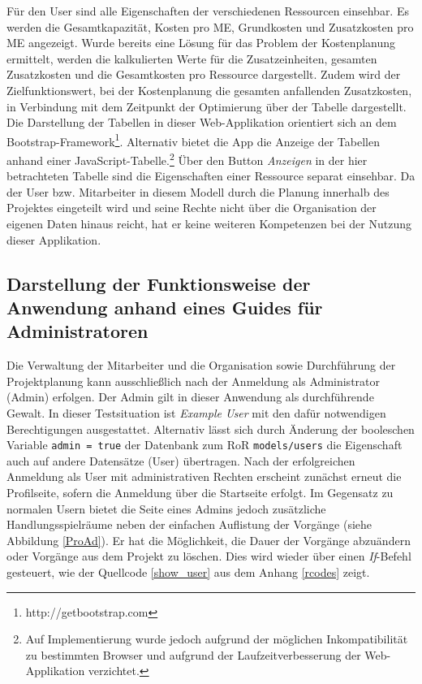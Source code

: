 \documentclass[a4paper,12pt,parskip,bibtotoc,liststotoc]{article}
\begin{document}
Für den User sind alle Eigenschaften der verschiedenen Ressourcen einsehbar. Es werden die Gesamtkapazität, Kosten pro ME, Grundkosten und Zusatzkosten pro ME angezeigt. Wurde bereits eine Lösung für das Problem der Kostenplanung ermittelt, werden die kalkulierten Werte für die Zusatzeinheiten, gesamten Zusatzkosten und die Gesamtkosten pro Ressource dargestellt. Zudem wird der Zielfunktionswert, bei der Kostenplanung die gesamten anfallenden Zusatzkosten, in Verbindung mit dem Zeitpunkt der Optimierung über der Tabelle dargestellt. Die Darstellung der Tabellen in dieser Web-Applikation orientiert sich an dem Bootstrap-Framework\footnote{http://getbootstrap.com}. Alternativ bietet die App die Anzeige der Tabellen anhand einer JavaScript-Tabelle.\footnote{Auf Implementierung wurde jedoch aufgrund der möglichen Inkompatibilität zu bestimmten Browser und aufgrund der Laufzeitverbesserung der Web-Applikation verzichtet.} Über den Button \textit{Anzeigen} in der hier betrachteten Tabelle sind die Eigenschaften einer Ressource separat einsehbar. Da der User bzw. Mitarbeiter in diesem Modell durch die Planung innerhalb des Projektes eingeteilt wird und seine Rechte nicht über die Organisation der eigenen Daten hinaus reicht, hat er keine weiteren Kompetenzen bei der Nutzung dieser Applikation. \\

\subsection{Darstellung der Funktionsweise der Anwendung anhand eines Guides für Administratoren}\label{Admins}

Die Verwaltung der Mitarbeiter und die Organisation sowie Durchführung der Projektplanung kann ausschließlich nach der Anmeldung als Administrator (Admin) erfolgen. Der Admin gilt in dieser Anwendung als durchführende Gewalt. In dieser Testsituation ist \textit{Example User} mit den dafür notwendigen Berechtigungen ausgestattet. Alternativ lässt sich durch Änderung der booleschen Variable \texttt{admin = true} der Datenbank zum RoR \texttt{models/users} die Eigenschaft auch auf andere Datensätze (User) übertragen. Nach der erfolgreichen Anmeldung als User mit administrativen Rechten erscheint zunächst erneut die Profilseite, sofern die Anmeldung über die Startseite erfolgt. Im Gegensatz zu normalen Usern bietet die Seite eines Admins jedoch zusätzliche Handlungsspielräume neben der einfachen Auflistung der Vorgänge (siehe Abbildung \ref{ProAd}). Er hat die Möglichkeit, die Dauer der Vorgänge abzuändern oder Vorgänge aus dem Projekt zu löschen. Dies wird wieder über einen \textit{If}-Befehl gesteuert, wie der Quellcode \ref{show_user} aus dem Anhang \ref{rcodes} zeigt.\\
\end{document}
